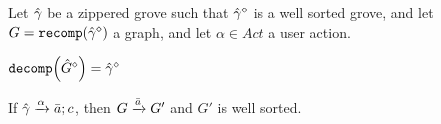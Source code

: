 Let $\Z{\Grove}$ be a zippered grove such that $\erase{\Z{\Grove}}$ is a well sorted grove,
and let $G = \recomp{\erase{\Z{\Grove}}}$ a graph,
and let $\alpha \in Act$ a user action.



% 
$\decomp{\erase{\Z{G}}} = \erase{\Z{\Grove}}$



\begin{theorem}[Sensibility]
  If $\applyAction{\Z{\Grove}}{\alpha}{\Q{a}}{c}$,
  then $G \action{\Q{a}} G'$ and $G'$ is well sorted.
\end{theorem}







